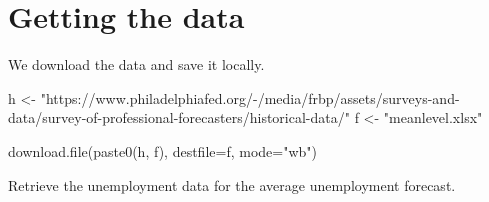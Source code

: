 \documentclass[
  letterpaper,
]{book}
\newenvironment{Shaded}{\begin{snugshade}}{\end{snugshade}}
\newcommand{\AttributeTok}[1]{\textcolor[rgb]{0.40,0.45,0.13}{#1}}
\newcommand{\FunctionTok}[1]{\textcolor[rgb]{0.28,0.35,0.67}{#1}}
\newcommand{\NormalTok}[1]{\textcolor[rgb]{0.00,0.23,0.31}{#1}}
\newcommand{\OtherTok}[1]{\textcolor[rgb]{0.00,0.23,0.31}{#1}}
\newcommand{\StringTok}[1]{\textcolor[rgb]{0.13,0.47,0.30}{#1}}
\begin{document}
\hypertarget{getting-the-data}{%
\section{Getting the data}\label{getting-the-data}}

We download the data and save it locally.

\begin{Shaded}
\begin{Highlighting}[]
\NormalTok{h }\OtherTok{\textless{}{-}} \StringTok{"https://www.philadelphiafed.org/{-}/media/frbp/assets/surveys{-}and{-}data/survey{-}of{-}professional{-}forecasters/historical{-}data/"}
\NormalTok{f }\OtherTok{\textless{}{-}} \StringTok{"meanlevel.xlsx"}

\FunctionTok{download.file}\NormalTok{(}\FunctionTok{paste0}\NormalTok{(h, f), }\AttributeTok{destfile=}\NormalTok{f, }\AttributeTok{mode=}\StringTok{"wb"}\NormalTok{)}
\end{Highlighting}
\end{Shaded}

Retrieve the unemployment data for the average unemployment forecast.
\end{document}
